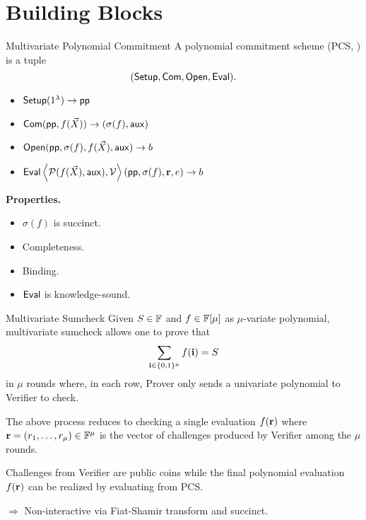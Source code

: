 \section{Building Blocks}
\begin{frame}{Multivariate Polynomial Commitment}
	A polynomial commitment scheme (PCS, \cite{AC:KatZavGol10}) is a tuple $$(\mathsf{Setup}, \mathsf{Com}, \mathsf{Open}, \mathsf{Eval}).$$
	\begin{itemize}
		\item $ \mathsf{Setup}(1^\lambda)\to\mathsf{pp}$
		\item $\mathsf{Com}(\mathsf{pp}, f(\vec{X}))\to(\sigma(f), \mathsf{aux})$
		\item $\mathsf{Open}(\mathsf{pp}, \sigma(f), f(\vec{X}), \mathsf{aux})\to b$
		\item $ \mathsf{Eval} \left\langle\mathcal{P}( f(\vec{X}), \mathsf{aux} ),\mathcal{V}\right\rangle (\mathsf{pp}, \sigma(f), \mathbf{r}, e)\to b$
	\end{itemize}
	
	\textbf{Properties.}
	\begin{itemize}
		\item $\sigma(f)$ is succinct. 
		\item Completeness.
		\item  Binding.
		\item $\mathsf{Eval}$ is knowledge-sound.
	\end{itemize}
\end{frame}
\begin{frame}{Multivariate Sumcheck}
	Given $S \in \mathbb{F}$ and $f \in \mathbb{F}[\mu]$ as $\mu$-variate polynomial, multivariate sumcheck \cite{FOCS:LundFKN90} allows one to prove that 
	\begin{equation*}
		\sum_{\mathbf{i} \in \{0,1\}^\mu} f(\mathbf{i}) = S
	\end{equation*} 
	in $\mu$ rounds where, in each row, Prover only sends a univariate polynomial to Verifier to check.
	
	The above process reduces to checking a single evaluation $f(\mathbf{r})$ where $\mathbf{r} = (r_1, \dots, r_\mu) \in \mathbb{F}^\mu$ is the vector of challenges produced by Verifier among the $\mu$ rounds.
	
	Challenges from Verifier are public coins while the final polynomial evaluation $f(\mathbf{r})$ can be realized by evaluating from PCS.
	
	$\Rightarrow$ Non-interactive via Fiat-Shamir transform \cite{CRYPTO:FiaSha86} and succinct.
\end{frame}

